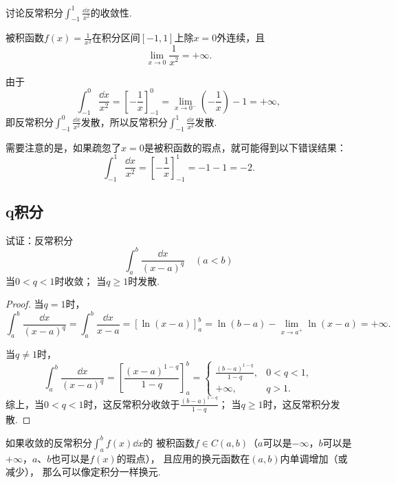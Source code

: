 \begin{example}
讨论反常积分\(\int_{-1}^1 \frac{\dd{x}}{x^2}\)的收敛性.
\begin{solution}
被积函数\(f(x) = \frac{1}{x^2}\)在积分区间\([-1,1]\)上除\(x=0\)外连续，且\[
\lim\limits_{x\to0} \frac{1}{x^2} = +\infty.
\]

由于\[
\int_{-1}^0 \frac{\dd{x}}{x^2}
= \left[-\frac{1}{x}\right]_{-1}^0
= \lim\limits_{x\to0^-} \left(-\frac{1}{x}\right) - 1
= +\infty,
\]即反常积分\(\int_{-1}^0 \frac{\dd{x}}{x^2}\)发散，所以反常积分\(\int_{-1}^1 \frac{\dd{x}}{x^2}\)发散.
\end{solution}

需要注意的是，如果疏忽了\(x=0\)是被积函数的瑕点，就可能得到以下错误结果：\[
\int_{-1}^1 \frac{\dd{x}}{x^2}
= \left[ -\frac{1}{x} \right]_{-1}^1
= -1 - 1 = -2.
\]
\end{example}

\subsection{q积分}
\begin{example}[q积分]\label{example:定积分.q积分}
试证：反常积分\[
\int_a^b \frac{\dd{x}}{(x-a)^q} \quad(a<b)
\]
当\(0 < q < 1\)时收敛；
当\(q \geqslant 1\)时发散.
\begin{proof}
当\(q=1\)时，\[
\int_a^b \frac{\dd{x}}{(x-a)^q}
= \int_a^b \frac{\dd{x}}{x-a}
= [\ln(x-a)]_a^b
= \ln(b-a) - \lim\limits_{x \to a^+} \ln(x-a) = +\infty.
\]

\def\arraystretch{1.5}
当\(q\neq1\)时，\[
\int_a^b \frac{\dd{x}}{(x-a)^q}
= \left[ \frac{(x-a)^{1-q}}{1-q} \right]_a^b
= \left\{ \begin{array}{cc}
\frac{(b-a)^{1-q}}{1-q}, & 0<q<1, \\
+\infty, & q>1.
\end{array} \right.
\]
综上，当\(0<q<1\)时，这反常积分收敛于\(\frac{(b-a)^{1-q}}{1-q}\)；
当\(q\geqslant1\)时，这反常积分发散.
\end{proof}
\end{example}

如果收敛的反常积分\(\int_a^b f(x) \dd{x}\)的%
被积函数\(f \in C(a,b)\)（\(a\)可以是\(-\infty\)，\(b\)可以是\(+\infty\)，\(a\)、\(b\)也可以是\(f(x)\)的瑕点），%
且应用的换元函数在\((a,b)\)内单调增加（或减少），%
那么可以像定积分一样换元.


